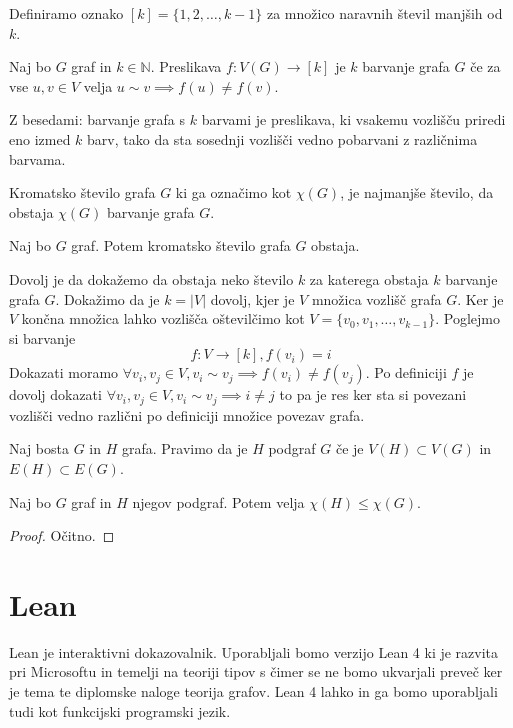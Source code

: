 \documentclass[mat1]{fmfdelo}
\begin{document}
\begin{definicija}
    Definiramo oznako $[k] = \{1, 2, \dots, k-1\}$ za množico naravnih števil manjših od $k$.
\end{definicija}

\begin{definicija}
    Naj bo $G$ graf in $k\in \mathbb{N}$. Preslikava $f:V(G)\to [k]$ je $k$ barvanje grafa $G$ če za vse $u, v\in V$ velja $u\sim v \implies f(u)\neq f(v)$.
\end{definicija}
Z besedami: barvanje grafa s $k$ barvami je preslikava, ki vsakemu vozlišču priredi eno izmed $k$ barv, tako da sta sosednji vozlišči vedno pobarvani z različnima barvama.

\begin{definicija}
    Kromatsko število grafa $G$ ki ga označimo kot $\chi(G)$, je najmanjše število, da obstaja $\chi(G)$ barvanje grafa $G$.
\end{definicija}
\begin{lema}
    Naj bo $G$ graf. Potem kromatsko število grafa $G$ obstaja.
\end{lema}
\begin{dokaz}
    Dovolj je da dokažemo da obstaja neko število $k$ za katerega obstaja $k$ barvanje grafa $G$.
    Dokažimo da je $k=|V|$ dovolj, kjer je $V$ množica vozlišč grafa $G$. Ker je $V$ končna množica
    lahko vozlišča oštevilčimo kot $V = \{v_0, v_1, \dots, v_{k-1}\}$. Poglejmo si barvanje 
    \[ f:V \to [k], f(v_i) = i\]
    Dokazati moramo $\forall v_i, v_j \in V, v_i \sim v_j\implies f(v_i)\neq f(v_j)$. Po definiciji $f$ je dovolj dokazati
    $\forall v_i, v_j \in V, v_i \sim v_j\implies i\neq j$ to pa je res ker sta si povezani vozlišči vedno različni po definiciji množice
    povezav grafa.
\end{dokaz}

\begin{definicija}
Naj bosta $G$ in $H$ grafa. Pravimo da je $H$ podgraf $G$ če je $V(H)\subset V(G)$ in $E(H)\subset E(G)$.
\end{definicija}
\begin{lema}
    Naj bo $G$ graf in $H$ njegov podgraf. Potem velja $\chi(H)\leq \chi(G)$.
\end{lema}
\begin{proof}
    Očitno.
\end{proof}

\section{Lean}
Lean je interaktivni dokazovalnik. Uporabljali bomo verzijo Lean 4 ki je razvita pri Microsoftu in temelji na teoriji tipov
s čimer se ne bomo ukvarjali preveč ker je tema te diplomske naloge teorija grafov. Lean 4 lahko in ga bomo uporabljali tudi
kot funkcijski programski jezik. 
\end{document}
